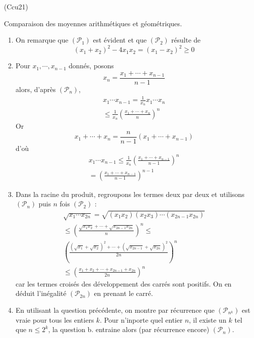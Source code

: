 \begin{tiny}(Ccu21)\end{tiny} Comparaison des moyennes arithmétiques et géométriques.
\begin{enumerate}
  \item On remarque que $(\mathcal{P}_{1})$ est évident et que $(\mathcal{P}_{2})$ résulte de
\begin{displaymath}
  (x_1+x_2)^2-4x_1x_2=(x_1-x_2)^2\geq 0
\end{displaymath}
 \item Pour $x_1,\cdots, x_{n-1}$ donnés, posons
\begin{displaymath}
x_n = \frac{x_1+\cdots +x_{n-1}}{n-1}  
\end{displaymath}
alors, d'après $(\mathcal{P}_n)$,
\begin{multline*}
x_1\cdots x_{n-1}=\frac{1}{x_n}x_1\cdots x_n \\
\leq \frac{1}{x_n} \left(\frac{x_1+\cdots+x_{n}}{n} \right)^n 
\end{multline*}
Or
\begin{displaymath}
x_1+\cdots +x_n =\frac{n}{n-1}(x_1+\cdots+x_{n-1})
\end{displaymath}
d'où
\begin{multline*}
x_1\cdots x_{n-1}\leq \frac{1}{x_n} \left(\frac{x_1+\cdots+x_{n-1}}{n-1} \right)^n \\
= \left(\frac{x_1+\cdots+x_{n-1}}{n-1} \right)^{n-1}
\end{multline*}
\item Dans la racine du produit, regroupons les termes deux par deux et utilisons $(\mathcal{P}_n)$ puis $n$ fois $(\mathcal{P}_2)$ :
\begin{multline*}
\sqrt{x_1\cdots x_{2n}} = \sqrt{(x_1 x_2)(x_2 x_3)\cdots (x_{2n-1}x_{2n})} \\
\leq \left(\frac{\sqrt{x_1x_2}+\cdots+\sqrt{x_{2n-1}x_{2n}}}{n} \right)^n \leq \\ \left(\frac{(\sqrt{x_1}+\sqrt{x_2})^2+\cdots+(\sqrt{x_{2n-1}}+\sqrt{x_{2n}})^2}{2n} \right)^n \\
\leq \left( \frac{x_1+x_2 + \cdots +x_{2n-1} +x_{2n}}{2n}\right)^n 
\end{multline*}
car les termes croisés des développement des carrés sont positifs. On en déduit l'inégalité $(\mathcal{P}_{2n})$ en prenant le carré.

\item En utilisant la question précédente, on montre par récurrence que $(\mathcal{P}_{n^k})$ est vraie pour tous les entiers $k$. Pour n'inporte quel entier $n$, il existe un $k$ tel que $n\leq 2^k$, la question b. entraine alors (par récurrence encore) $(\mathcal{P}_n)$.
\end{enumerate}
